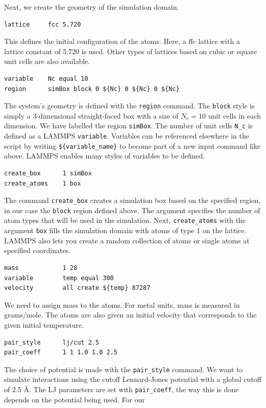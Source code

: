 \documentclass[twoside,english]{uiofysmaster}
\begin{document}
\noindent Next, we create the geometry of the simulation domain.
\begin{lstlisting}[style=lammps]
lattice 	fcc 5.720
\end{lstlisting}
This defines the initial configuration of the atoms. 
Here, a ffc lattice with a lattice constant of
5.720 is used. Other types of lattices based on
cubic or square unit cells are also available. 
\begin{lstlisting}[style=lammps]
variable	Nc equal 10
region 		simBox block 0 ${Nc} 0 ${Nc} 0 ${Nc}
\end{lstlisting}
The system's geometry is defined with the \texttt{region}
command. The \texttt{block} style is simply a 3-dimensional
straight-faced box with a size of $N_c = 10$ unit
cells in each dimension. We have labelled the 
region \texttt{simBox}. 
The number of unit cells
\texttt{N\_c} is defined as a LAMMPS \texttt{variable}. Variables
can be referenced elsewhere in the script by
writing \texttt{\$\{variable\_name\}} to become part of a new input
command like above. LAMMPS enables many styles
of variables to be defined. 
\begin{lstlisting}[style=lammps]
create_box		1 simBox
create_atoms	1 box
\end{lstlisting}
The command \texttt{create\_box} creates a simulation box 
based on the specified region, in our case the 
\texttt{block} region defined above. The argument specifies
the number of atom types that will be used in the
simulation. Next, \texttt{create\_atoms} with the argument
\texttt{box} fills the simulation
domain with atoms of type 1 on the lattice. 
LAMMPS also lets you create a random collection
of atoms or single atoms at specified coordinates.
\begin{lstlisting}[style=lammps]
mass			1 28
variable		temp equal 300
velocity		all create ${temp} 87287 
\end{lstlisting}
We need to assign mass to the atoms. For metal units, 
mass is measured in grams/mole. The atoms are also
given an initial velocity that corresponds to 
the given initial temperature. 
\begin{lstlisting}[style=lammps]
pair_style		lj/cut 2.5
pair_coeff		1 1 1.0 1.0 2.5
\end{lstlisting}
The choice of potential is made with the 
\texttt{pair\_style} command. We want to simulate
interactions using the cutoff Lennard-Jones potential
with a global cutoff of 2.5 Å. The LJ parameters
are set with \texttt{pair\_coeff}, the way this is done
depends on the potential being used. For our
\end{document}
